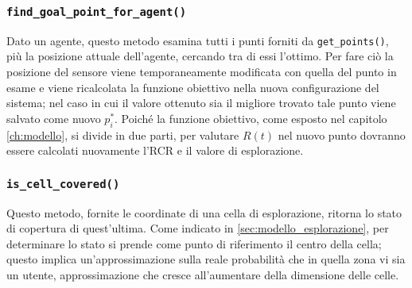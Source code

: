 %

\subsubsection{\texttt{find\_goal\_point\_for\_agent()}}
Dato un agente, questo metodo esamina tutti i punti forniti da \texttt{get\_points()}, più la posizione attuale dell'agente, cercando tra di essi l'ottimo.
Per fare ciò la posizione del sensore viene temporaneamente modificata con quella del punto in esame e viene ricalcolata la funzione obiettivo nella nuova configurazione del sistema; nel caso in cui il valore ottenuto sia il migliore trovato tale punto viene salvato come nuovo $p_i^*$.
Poiché la funzione obiettivo, come esposto nel capitolo \ref{ch:modello}, si divide in due parti, per valutare $R(t)$ nel nuovo punto dovranno essere calcolati nuovamente l'RCR e il valore di esplorazione.

\subsubsection{\texttt{is\_cell\_covered()}}
Questo metodo, fornite le coordinate di una cella di esplorazione, ritorna lo stato di copertura di quest'ultima.
Come indicato in \ref{sec:modello_esplorazione}, per determinare lo stato si prende come punto di riferimento il centro della cella; questo implica un'approssimazione sulla reale probabilità che in quella zona vi sia un utente, approssimazione che cresce all'aumentare della dimensione delle celle.


